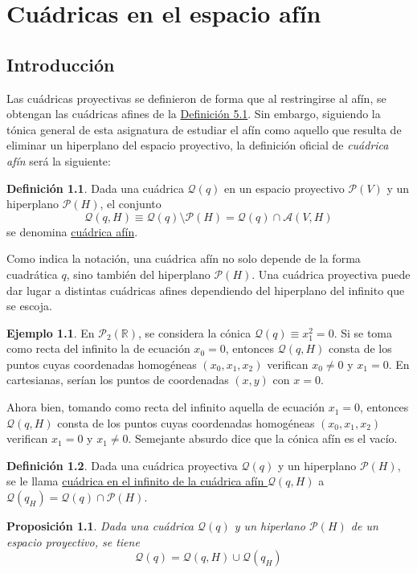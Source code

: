 \documentclass[12pt]{report}
\newtheorem{proposition}{Proposición}[chapter]
\theoremstyle{definition}
\newtheorem{definition}{Definición}[chapter]
\theoremstyle{definition}
\newtheorem{example}{Ejemplo}[chapter]
\theoremstyle{remark}
\newcommand{\R}{\mathbb R}
\begin{document}
\chapter{Cuádricas en el espacio afín}

\section{Introducción}

Las cuádricas proyectivas se definieron de forma que al restringirse al afín, se obtengan las cuádricas afines de la \hyperref[def5.1.]{\color{blue}Definición 5.1}. Sin embargo, siguiendo la tónica general de esta asignatura de estudiar el afín como aquello que resulta de eliminar un hiperplano del espacio proyectivo, la definición oficial de \textit{cuádrica afín} será la siguiente:

\begin{definition}
Dada una cuádrica $\mathcal{Q}(q)$ en un espacio proyectivo $\mathcal{P}(V)$ y un hiperplano $\mathcal{P}(H)$, el conjunto
\[\mathcal{Q}(q, H) \equiv \mathcal{Q}(q) \setminus \mathcal{P}(H) = \mathcal{Q}(q) \cap \mathcal{A}(V,H)\]
se denomina \ul{cuádrica afín}.
\end{definition}

Como indica la notación, una cuádrica afín no solo depende de la forma cuadrática $q$, sino también del hiperplano $\mathcal{P}(H)$. Una cuádrica proyectiva puede dar lugar a distintas cuádricas afines dependiendo del hiperplano del infinito que se escoja.

\begin{example}
En $\mathcal{P}_2(\R)$, se considera la cónica $\mathcal{Q}(q) \equiv x_1^2 =0$. Si se toma como recta del infinito la de ecuación $x_0 = 0$, entonces $\mathcal{Q}(q,H)$ consta de los puntos cuyas coordenadas homogéneas $(x_0,x_1,x_2)$ verifican $x_0 \neq 0$ y $x_1 = 0$. En cartesianas, serían los puntos de coordenadas $(x,y)$ con $x = 0$.

\vspace{2mm}
\noindent
Ahora bien, tomando como recta del infinito aquella de ecuación $x_1 = 0$, entonces $\mathcal{Q}(q,H)$ consta de los puntos cuyas coordenadas homogéneas $(x_0,x_1,x_2)$ verifican $x_1 = 0$ y $x_1 \neq 0$. Semejante absurdo dice que la cónica afín es el vacío.
\end{example}

\begin{definition}
Dada una cuádrica proyectiva $\mathcal{Q}(q)$ y un hiperplano $\mathcal{P}(H)$, se le llama \ul{cuádrica en el infinito de la cuádrica afín $\mathcal{Q}(q,H)$} a $\mathcal{Q}(q_H) = \mathcal{Q}(q) \cap \mathcal{P}(H)$.
\end{definition}
\begin{proposition}
Dada una cuádrica $\mathcal{Q}(q)$ y un hiperlano $\mathcal{P}(H)$ de un espacio proyectivo, se tiene
\[\mathcal{Q}(q) = \mathcal{Q}(q,H) \cup \mathcal{Q}(q_H)\]
\end{proposition}
\end{document}
